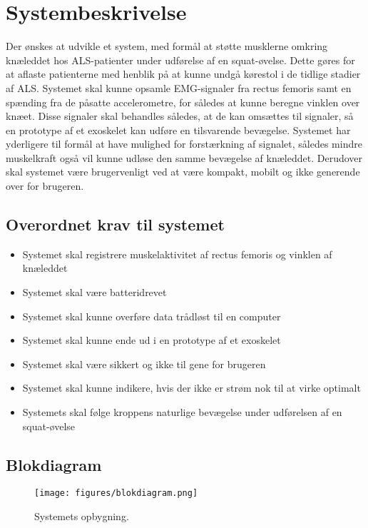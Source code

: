 \section{Systembeskrivelse}
Der ønskes at udvikle et system, med formål at støtte musklerne omkring knæleddet hos ALS-patienter under udførelse af en squat-øvelse. Dette gøres for at aflaste patienterne med henblik på at kunne undgå kørestol i de tidlige stadier af ALS. 
Systemet skal kunne opsamle EMG-signaler fra rectus femoris samt en spænding fra de påsatte accelerometre, for således at kunne beregne vinklen over knæet. Disse signaler skal behandles således, at de kan omsættes til signaler, så en prototype af et exoskelet kan udføre en tilsvarende bevægelse. 
Systemet har yderligere til formål at have mulighed for forstærkning af signalet, således mindre muskelkraft også vil kunne udløse den samme bevægelse af knæleddet. 
Derudover skal systemet være brugervenligt ved at være kompakt, mobilt og ikke generende over for brugeren.

\subsection{Overordnet krav til systemet}  \label{sec:overordnet_krav}
\begin{itemize}
\item Systemet skal registrere muskelaktivitet af rectus femoris og vinklen af knæleddet
\item Systemet skal være batteridrevet
\item Systemet skal kunne overføre data trådløst til en computer
\item Systemet skal kunne ende ud i en prototype af et exoskelet
\item Systemet skal være sikkert og ikke til gene for brugeren 
\item Systemet skal kunne indikere, hvis der ikke er strøm nok til at virke optimalt
\item Systemets skal følge kroppens naturlige bevægelse under udførelsen af en squat-øvelse
\end{itemize}


\subsection{Blokdiagram} \label{sec:blokdiagram}  
\begin{figure}[H]
\centering
\texttt{[image: figures/blokdiagram.png]}
\caption{Systemets opbygning.}
\label{fig:blokdiagram}
\end{figure}

